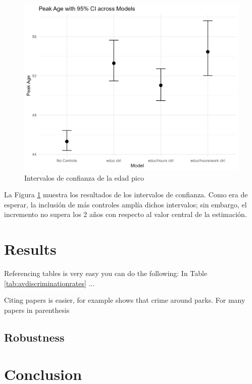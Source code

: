 \documentclass[12pt,a4paper,onecolumn]{article}
\begin{document}
\begin{figure}[H]
\caption{Intervalos de confianza de la edad pico} \label{fig:age_whiskey_bar}
    \includegraphics[scale=0.75]{../views/age_whiskey_point.png}   
 \flushleft
\end{figure}

La Figura \ref{fig:age_whiskey_bar} muestra los resultados de los intervalos de confianza. Como era de esperar, la inclusión de más controles amplía dichos intervalos; sin embargo, el incremento no supera los 2 años con respecto al valor central de la estimación.
\section{Results}

Referencing tables is very easy you can do the following: In Table \ref{tab:avdiscriminationrates} ...

Citing papers is easier, for example \cite{albouy2020unlocking} shows that crime around parks. For many papers in parenthesis \cite{albouy2020unlocking,mcmillen2019more} 

\subsection{Robustness}
\section{Conclusion}
\end{document}
